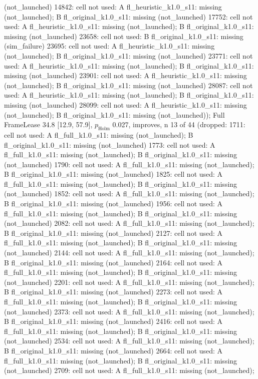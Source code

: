 \begin{table}[t]
{(not\_launched) \textbar{} 14842: cell not used: A fl\_heuristic\_k1.0\_s11: missing (not\_launched); B fl\_original\_k1.0\_s11: missing (not\_launched) \textbar{} 17752: cell not used: A fl\_heuristic\_k1.0\_s11: missing (not\_launched); B fl\_original\_k1.0\_s11: missing (not\_launched) \textbar{} 23658: cell not used: B fl\_original\_k1.0\_s11: missing (sim\_failure) \textbar{} 23695: cell not used: A fl\_heuristic\_k1.0\_s11: missing (not\_launched); B fl\_original\_k1.0\_s11: missing (not\_launched) \textbar{} 23771: cell not used: A fl\_heuristic\_k1.0\_s11: missing (not\_launched); B fl\_original\_k1.0\_s11: missing (not\_launched) \textbar{} 23901: cell not used: A fl\_heuristic\_k1.0\_s11: missing (not\_launched); B fl\_original\_k1.0\_s11: missing (not\_launched) \textbar{} 28087: cell not used: A fl\_heuristic\_k1.0\_s11: missing (not\_launched); B fl\_original\_k1.0\_s11: missing (not\_launched) \textbar{} 28099: cell not used: A fl\_heuristic\_k1.0\_s11: missing (not\_launched); B fl\_original\_k1.0\_s11: missing (not\_launched)); Full FrameLease 34.8 [12.9, 57.9], $p_\mathrm{Holm}$ 0.027, improves, n 13 of 44 (dropped: 1711: cell not used: A fl\_full\_k1.0\_s11: missing (not\_launched); B fl\_original\_k1.0\_s11: missing (not\_launched) \textbar{} 1773: cell not used: A fl\_full\_k1.0\_s11: missing (not\_launched); B fl\_original\_k1.0\_s11: missing (not\_launched) \textbar{} 1790: cell not used: A fl\_full\_k1.0\_s11: missing (not\_launched); B fl\_original\_k1.0\_s11: missing (not\_launched) \textbar{} 1825: cell not used: A fl\_full\_k1.0\_s11: missing (not\_launched); B fl\_original\_k1.0\_s11: missing (not\_launched) \textbar{} 1852: cell not used: A fl\_full\_k1.0\_s11: missing (not\_launched); B fl\_original\_k1.0\_s11: missing (not\_launched) \textbar{} 1956: cell not used: A fl\_full\_k1.0\_s11: missing (not\_launched); B fl\_original\_k1.0\_s11: missing (not\_launched) \textbar{} 2082: cell not used: A fl\_full\_k1.0\_s11: missing (not\_launched); B fl\_original\_k1.0\_s11: missing (not\_launched) \textbar{} 2127: cell not used: A fl\_full\_k1.0\_s11: missing (not\_launched); B fl\_original\_k1.0\_s11: missing (not\_launched) \textbar{} 2144: cell not used: A fl\_full\_k1.0\_s11: missing (not\_launched); B fl\_original\_k1.0\_s11: missing (not\_launched) \textbar{} 2164: cell not used: A fl\_full\_k1.0\_s11: missing (not\_launched); B fl\_original\_k1.0\_s11: missing (not\_launched) \textbar{} 2201: cell not used: A fl\_full\_k1.0\_s11: missing (not\_launched); B fl\_original\_k1.0\_s11: missing (not\_launched) \textbar{} 2273: cell not used: A fl\_full\_k1.0\_s11: missing (not\_launched); B fl\_original\_k1.0\_s11: missing (not\_launched) \textbar{} 2373: cell not used: A fl\_full\_k1.0\_s11: missing (not\_launched); B fl\_original\_k1.0\_s11: missing (not\_launched) \textbar{} 2416: cell not used: A fl\_full\_k1.0\_s11: missing (not\_launched); B fl\_original\_k1.0\_s11: missing (not\_launched) \textbar{} 2534: cell not used: A fl\_full\_k1.0\_s11: missing (not\_launched); B fl\_original\_k1.0\_s11: missing (not\_launched) \textbar{} 2664: cell not used: A fl\_full\_k1.0\_s11: missing (not\_launched); B fl\_original\_k1.0\_s11: missing (not\_launched) \textbar{} 2709: cell not used: A fl\_full\_k1.0\_s11: missing (not\_launched); }
\end{table}
